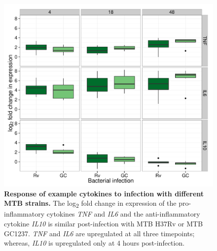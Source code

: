 \begin{figure}[htbp]
\centering
\includegraphics[width=5in]{img/ch02/fig-S08-ex-cytokines.pdf}
\caption[Response of example cytokines to infection with different MTB
  strains.]{\textbf{Response of example cytokines to infection with
    different MTB strains.} The log\textsubscript{2} fold change in
  expression of the pro-inflammatory cytokines \emph{TNF} and
  \emph{IL6} and the anti-inflammatory cytokine \emph{IL10} is similar
  post-infection with MTB H37Rv or MTB GC1237. \emph{TNF} and
  \emph{IL6} are upregulated at all three timepoints; whereas,
  \emph{IL10} is upregulated only at 4 hours post-infection.}
\label{fig:ex-cytokines}
\end{figure}

